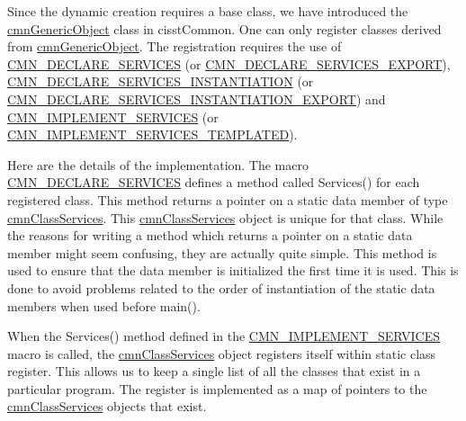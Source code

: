 Since the dynamic creation requires a base class, we have introduced the \hyperlink{classcmn_generic_object}{cmn\+Generic\+Object} class in cisst\+Common. One can only register classes derived from \hyperlink{classcmn_generic_object}{cmn\+Generic\+Object}. The registration requires the use of \hyperlink{cmn_class_register_macros_8h_a7fbab4cbcdfbf35062de4f734e697034}{C\+M\+N\+\_\+\+D\+E\+C\+L\+A\+R\+E\+\_\+\+S\+E\+R\+V\+I\+C\+E\+S} (or \hyperlink{cmn_class_register_macros_8h_a3dcd7732deee3f450741f0eb099ff778}{C\+M\+N\+\_\+\+D\+E\+C\+L\+A\+R\+E\+\_\+\+S\+E\+R\+V\+I\+C\+E\+S\+\_\+\+E\+X\+P\+O\+R\+T}), \hyperlink{mts_text_to_speech_8h_aae5c71840342a68c45d71caab531fec2}{C\+M\+N\+\_\+\+D\+E\+C\+L\+A\+R\+E\+\_\+\+S\+E\+R\+V\+I\+C\+E\+S\+\_\+\+I\+N\+S\+T\+A\+N\+T\+I\+A\+T\+I\+O\+N} (or \hyperlink{svl_filter_splitter_8h_ad1a0b59b6425e7aa5f3a61f12d7f0da2}{C\+M\+N\+\_\+\+D\+E\+C\+L\+A\+R\+E\+\_\+\+S\+E\+R\+V\+I\+C\+E\+S\+\_\+\+I\+N\+S\+T\+A\+N\+T\+I\+A\+T\+I\+O\+N\+\_\+\+E\+X\+P\+O\+R\+T}) and \hyperlink{cmn_class_register_macros_8h_a59997edde1868f5ce515ff85dfeaf2f8}{C\+M\+N\+\_\+\+I\+M\+P\+L\+E\+M\+E\+N\+T\+\_\+\+S\+E\+R\+V\+I\+C\+E\+S} (or \hyperlink{cmn_class_register_macros_8h_a6d3e8cb412f66ff7e73f3ab52290f471}{C\+M\+N\+\_\+\+I\+M\+P\+L\+E\+M\+E\+N\+T\+\_\+\+S\+E\+R\+V\+I\+C\+E\+S\+\_\+\+T\+E\+M\+P\+L\+A\+T\+E\+D}).

Here are the details of the implementation. The macro \hyperlink{cmn_class_register_macros_8h_a7fbab4cbcdfbf35062de4f734e697034}{C\+M\+N\+\_\+\+D\+E\+C\+L\+A\+R\+E\+\_\+\+S\+E\+R\+V\+I\+C\+E\+S} defines a method called Services() for each registered class. This method returns a pointer on a static data member of type \hyperlink{classcmn_class_services}{cmn\+Class\+Services}. This \hyperlink{classcmn_class_services}{cmn\+Class\+Services} object is unique for that class. While the reasons for writing a method which returns a pointer on a static data member might seem confusing, they are actually quite simple. This method is used to ensure that the data member is initialized the first time it is used. This is done to avoid problems related to the order of instantiation of the static data members when used before {\ttfamily main()}.

When the Services() method defined in the \hyperlink{cmn_class_register_macros_8h_a59997edde1868f5ce515ff85dfeaf2f8}{C\+M\+N\+\_\+\+I\+M\+P\+L\+E\+M\+E\+N\+T\+\_\+\+S\+E\+R\+V\+I\+C\+E\+S} macro is called, the \hyperlink{classcmn_class_services}{cmn\+Class\+Services} object registers itself within static class register. This allows us to keep a single list of all the classes that exist in a particular program. The register is implemented as a map of pointers to the \hyperlink{classcmn_class_services}{cmn\+Class\+Services} objects that exist.


